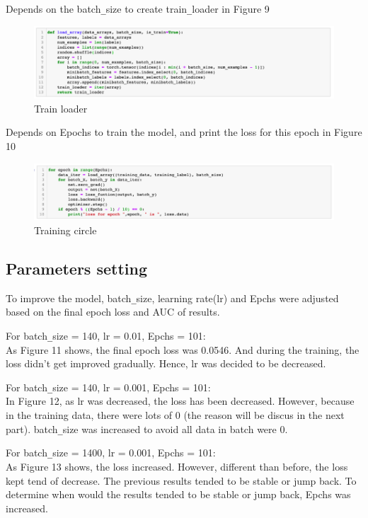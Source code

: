 \documentclass{article}
\begin{document}
Depends on the batch\verb+_+size to create train\verb+_+loader in Figure 9

\begin{figure}[h]
  \centering
  \includegraphics[width=1.0\textwidth]{img/Picture 8}
  \caption{Train loader }
\end{figure}

Depends on Epochs to train the model, and print the loss for this epoch in Figure 10

\begin{figure}[h]
  \centering
  \includegraphics[width=1.0\textwidth]{img/Picture 9}
  \caption{Training circle}
\end{figure}

\subsection{Parameters setting}

To improve the model, batch\verb+_+size, learning rate(lr) and Epchs were adjusted based on the final epoch loss and AUC of results.

For batch\verb+_+size = 140, lr = 0.01, Epchs = 101:\\
As Figure 11 shows, the final epoch loss was 0.0546. And during the training, the loss didn’t get improved gradually. Hence, lr was decided to be decreased.

For batch\verb+_+size = 140, lr = 0.001, Epchs = 101:\\
In Figure 12, as lr was decreased, the loss has been decreased. However, because in the training data, there were lots of 0 (the reason will be discus in the next part). batch\verb+_+size was increased to avoid all data in batch were 0.

For batch\verb+_+size = 1400, lr = 0.001, Epchs = 101:\\
As Figure 13 shows, the loss increased. However, different than before, the loss kept tend of decrease. The previous results tended to be stable or jump back. To determine when would the results tended to be stable or jump back, Epchs was increased.
\end{document}
